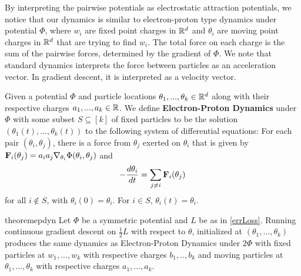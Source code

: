 By interpreting the pairwise potentials as electrostatic attraction
potentials, we notice that our dynamics is similar to electron-proton
type dynamics under potential $\Phi$, where $w_i$ are fixed point
charges in ${\mathbb{R}}^d$ and $\theta_i$ are moving point charges in ${\mathbb{R}}^d$
that are trying to find $w_i$. The total force on each charge is the
sum of the pairwise forces, determined by the gradient of $\Phi.$ We
note that standard dynamics interprets the force between particles as
an acceleration vector. In gradient descent, it is interpreted as a
velocity vector.
%
\begin{definition}\label{EPDef}
  Given a potential $\Phi$ and particle locations
  $\theta_1,...,\theta_k \in \mathbb R^d$ along with their respective
  charges $a_1,...,a_k \in {\mathbb{R}}$. We define {\bf Electron-Proton
    Dynamics} under $\Phi$ with some subset $S \subseteq [k]$ of fixed
  particles to be the solution $(\theta_1(t),...,\theta_k(t))$ to the
  following system of differential equations: For each pair
  $(\theta_i,\theta_j)$, there is a force from $\theta_j$ exerted on
  $\theta_i$ that is given by
  ${\bf F}_{i}(\theta_j) = a_ia_j\nabla_{\theta_i}
  \Phi(\theta_i,\theta_j)$ and
\[-\frac{d\theta_i}{dt} =  \sum_{ j \neq i} {\bf F}_{i}(\theta_j)\]
for all $i \not \in S$, with $\theta_i(0) = \theta_i$. For $i \in S$, $\theta_i(t) =  \theta_i$.
\end{definition}
%
\begin{restatable}{theorem}{epdyn}
\label{EPDyn}
Let $\Phi$ be a symmetric potential and $L$ be as in \eqref{errLoss}. Running continuous gradient descent on $\frac{1}{2} L$ with respect to $\theta$, initialized at
$(\theta_1,...,\theta_k)$ produces the same dynamics as
Electron-Proton Dynamics under $2\Phi$ with fixed particles at
$w_1,...,w_k$ with respective charges $b_1,..,b_k$ and moving
particles at $\theta_1,...,\theta_k$ with respective charges
$a_1,...,a_k$.
\end{restatable} 


%

